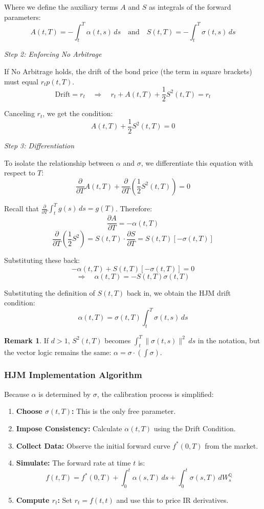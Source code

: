 \documentclass[12pt,a4paper]{article}
\theoremstyle{definition}
\newtheorem{remark}{Remark}[section]
\newcommand{\Q}{\mathbb{Q}}
\begin{document}
Where we define the auxiliary terms $A$ and $S$ as integrals of the forward parameters:
\[
A(t,T) = -\int_t^T \alpha(t,s)\,ds \quad \text{and} \quad S(t,T) = -\int_t^T \sigma(t,s)\,ds
\]

\textit{Step 2: Enforcing No Arbitrage}

If No Arbitrage holds, the drift of the bond price (the term in square brackets) must equal $r_t p(t,T)$.
\[
\text{Drift} = r_t \quad \Longrightarrow \quad r_t + A(t,T) + \frac{1}{2}S^2(t,T) = r_t
\]

Canceling $r_t$, we get the condition:
\[
A(t,T) + \frac{1}{2}S^2(t,T) = 0
\]

\textit{Step 3: Differentiation}

To isolate the relationship between $\alpha$ and $\sigma$, we differentiate this equation with respect to $T$:
\[
\frac{\partial}{\partial T}A(t,T) + \frac{\partial}{\partial T}\left(\frac{1}{2}S^2(t,T)\right) = 0
\]

Recall that $\frac{\partial}{\partial T}\int_t^T g(s)\,ds = g(T)$. Therefore:
\[
\frac{\partial A}{\partial T} = -\alpha(t,T)
\]
\[
\frac{\partial}{\partial T}\left(\frac{1}{2}S^2\right) = S(t,T) \cdot \frac{\partial S}{\partial T} = S(t,T)[-\sigma(t,T)]
\]

Substituting these back:
\[
-\alpha(t,T) + S(t,T)[-\sigma(t,T)] = 0
\]
\[
\Longrightarrow \quad \alpha(t,T) = -S(t,T)\sigma(t,T)
\]

Substituting the definition of $S(t,T)$ back in, we obtain the HJM drift condition:
\[
\alpha(t,T) = \sigma(t,T)\int_t^T \sigma(t,s)\,ds
\]

\begin{remark}
If $d > 1$, $S^2(t,T)$ becomes $\int_t^T \|\sigma(t,s)\|^2\,ds$ in the notation, but the vector logic remains the same: $\alpha = \sigma \cdot (\int \sigma)$.
\end{remark}

\subsubsection{HJM Implementation Algorithm}

Because $\alpha$ is determined by $\sigma$, the calibration process is simplified:

\begin{enumerate}
\item \textbf{Choose $\sigma(t,T)$:} This is the only free parameter.

\item \textbf{Impose Consistency:} Calculate $\alpha(t,T)$ using the Drift Condition.

\item \textbf{Collect Data:} Observe the initial forward curve $f^*(0,T)$ from the market.

\item \textbf{Simulate:} The forward rate at time $t$ is:
\[
f(t,T) = f^*(0,T) + \int_0^t \alpha(s,T)\,ds + \int_0^t \sigma(s,T)\,dW_s^{\Q}
\]

\item \textbf{Compute $r_t$:} Set $r_t = f(t,t)$ and use this to price IR derivatives.
\end{enumerate}
\end{document}
